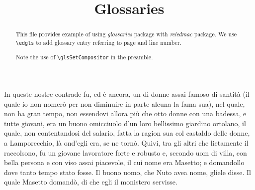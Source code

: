 \documentclass{article}
\begin{document}
\begin{english}
\title{Glossaries}
\date{}
\maketitle
\begin{abstract}
This file provides example of using \emph{glossaries} package with \emph{reledmac} package.
We use \verb+\edgls+ to add glossary entry referring to page and line number.

Note the use of \verb+\glsSetCompositor+ in the preamble.
\end{abstract}

\end{english}

\beginnumbering
\pstart
In queste nostre contrade fu, ed è ancora, un  di donne assai famoso di santità
(il quale io non nomerò per non diminuire in parte alcuna la fama sua), nel quale, non ha gran
tempo, non essendovi allora più che otto donne con una badessa, e tutte giovani, era un buono
omicciuolo d'un loro bellissimo giardino ortolano, il quale, non contentandosi del salario, fatta la
ragion sua col castaldo delle donne, a Lamporecchio, là ond'egli era, se ne tornò. Quivi, tra gli
altri che lietamente il raccolsono, fu un giovane lavoratore forte e robusto e, secondo uom di villa,
con bella persona e con viso assai piacevole, il cui nome era Masetto; e
domandollo dove tanto tempo stato fosse. Il buono uomo, che Nuto avea nome,
gliele disse. Il quale Masetto domandò, di che egli il monistero servisse. 
\pend
\endnumbering
\printglossaries
\end{document}
